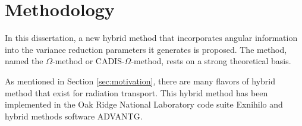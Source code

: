 \section{Methodology}
\label{sec:methodology}

In this dissertation, a new hybrid method that incorporates angular information
into the variance reduction parameters it generates is proposed. The method,
named the $\Omega$-method or CADIS-$\Omega$-method, rests on a strong
theoretical basis.

As mentioned in Section \ref{sec:motivation}, there are many flavors of hybrid
method that exist for radiation transport. This hybrid
method has been implemented in the Oak Ridge National Laboratory code suite
Exnihilo and hybrid methods software ADVANTG.


